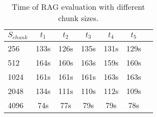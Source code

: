 \begin{table*}[ht!]
    \centering
    \begin{tabular}{lcccccc}
      \toprule
      $S_{chunk}$ & $t_1$ & $t_2$ & $t_3$ & $t_4$ & $t_5$ \\
      \midrule
      256  & 133s & 126s & 135s & 131s & 129s \\
      512  & 164s & 160s & 163s & 159s & 160s \\
      1024  & 161s & 161s & 161s & 163s & 163s \\
      2048  & 134s & 111s & 110s & 112s & 109s \\
      4096  & 74s & 77s & 79s & 79s & 78s \\
      \bottomrule
    \end{tabular}
    \caption{Time of \ac{RAG} evaluation with different chunk sizes.}
    \label{tab:RAG_time}
  \end{table*}
  
